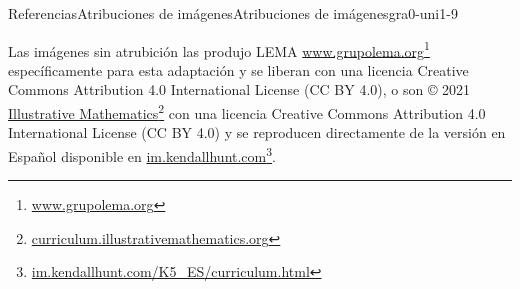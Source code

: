 %
%
\typeout{************************************************}
\typeout{************************************************}
%
\begin{references-section}{Referencias}{Atribuciones de imágenes}{}{Atribuciones de imágenes}{}{}{gra0-uni1-9}

\scriptsize 
\justifying
Las imágenes sin atrubición las produjo LEMA \href{https://www.grupolema.org}{www.grupolema.org}\footnote{\url{www.grupolema.org}\label{gra0-uni1-9-2-2}} específicamente para esta adaptación y se liberan con una licencia Creative Commons Attribution 4.0 International License (CC BY 4.0), o son © 2021 \href{https://curriculum.illustrativemathematics.org}{Illustrative Mathematics}\footnote{\url{curriculum.illustrativemathematics.org}\label{gra0-uni1-9-2-4}} con una licencia Creative Commons Attribution 4.0 International License (CC BY 4.0) y se reproducen directamente de la versión en Español disponible en \href{https://im.kendallhunt.com/K5_ES/curriculum.html}{im.kendallhunt.com}\footnote{\url{im.kendallhunt.com/K5_ES/curriculum.html}\label{gra0-uni1-9-2-6}}.%


\end{references-section}
%
%

